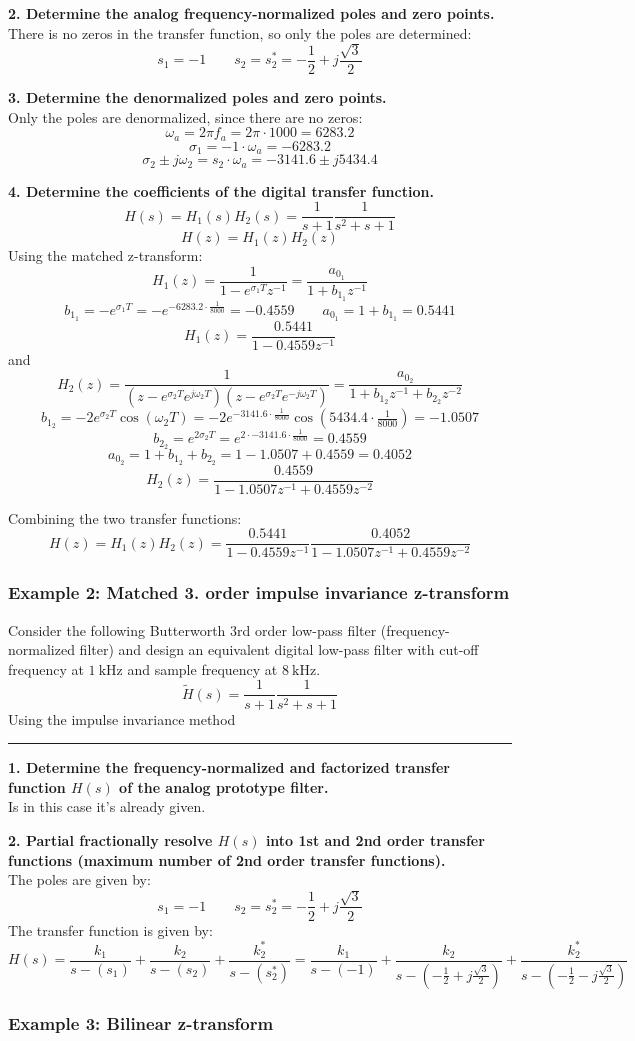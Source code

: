 \textbf{2. Determine the analog frequency-normalized poles and zero points.}\\
There is no zeros in the transfer function, so only the poles are determined:
$$s_1=-1 \qquad s_2=s_2^*=-\frac{1}{2}+j\frac{\sqrt{3}}{2}$$

\textbf{3. Determine the denormalized poles and zero points.}\\
Only the poles are denormalized, since there are no zeros:
$$\omega_a=2\pi f_a=2\pi\cdot 1000=6283.2$$
$$\sigma_1=-1\cdot\omega_a=-6283.2$$
$$\sigma_2\pm j\omega_2=s_2\cdot\omega_a=-3141.6\pm j5434.4$$

\textbf{4. Determine the coefficients of the digital transfer function.}
$$H(s)=H_1(s)H_2(s)=\frac{1}{s+1}\frac{1}{s^{2}+s+1}$$
$$H(z)=H_1(z)H_2(z)$$
Using the matched z-transform:
$$H_1(z)=\frac{1}{1-e^{\sigma_1 T}z^{-1}}=\frac{a_{0_1}}{1+b_{1_1}z^{-1}}$$
$$b_{1_1}=-e^{\sigma_1 T}=-e^{-6283.2\cdot\frac{1}{8000}}=-0.4559\qquad a_{0_1}=1+b_{1_1}=0.5441$$
$$H_1(z)=\frac{0.5441}{1-0.4559z^{-1}}$$
and
$$H_2(z)={\frac{1}{(z-e^{\sigma_{2}T}e^{j\omega_{2}T})(z-e^{\sigma_{2}T}e^{-j\omega_{2}T})}}=\frac{a_{0_2}}{1+b_{1_2}z^{-1}+b_{2_2}z^{-2}}$$
$$b_{1_2}=-2e^{\sigma_2 T}\cos(\omega_2 T)=-2e^{-3141.6\cdot\frac{1}{8000}}\cos(5434.4\cdot\tfrac{1}{8000})=-1.0507$$
$$b_{2_2}=e^{2\sigma_2 T}=e^{2\cdot -3141.6\cdot\frac{1}{8000}}=0.4559$$
$$a_{0_2}=1+b_{1_2}+b_{2_2}=1-1.0507+0.4559=0.4052$$
$$H_2(z)=\frac{0.4559}{1-1.0507z^{-1}+0.4559z^{-2}}$$

Combining the two transfer functions:
$$H(z)=H_1(z)H_2(z)=\frac{0.5441}{1-0.4559z^{-1}}\frac{0.4052}{1-1.0507z^{-1}+0.4559z^{-2}}$$

\subsubsection{Example 2: Matched 3. order impulse invariance z-transform}
Consider the following Butterworth 3rd order low-pass filter (frequency-normalized filter) 
and design an equivalent digital low-pass filter with cut-off frequency at $\SI{1}{\kilo\hertz}$ and sample frequency at $\SI{8}{\kilo\hertz}$. 
$${\tilde{H}}(s)=\frac{1}{s+1}\frac{1}{s^{2}+s+1}$$
Using the impulse invariance method

\rule{\textwidth}{0.5pt}

\textbf{1. Determine the frequency-normalized and factorized transfer function $H(s)$ of the analog prototype filter.}\\
Is in this case it's already given.

\textbf{2. Partial fractionally resolve $H(s)$ into 1st and 2nd order transfer functions (maximum number of 2nd order transfer functions).}\\
The poles are given by:
$$s_1=-1 \qquad s_2=s_2^*=-\frac{1}{2}+j\frac{\sqrt{3}}{2}$$
The transfer function is given by:
$$H(s)=\frac{k_1}{s-(s_1)}+\frac{k_2}{s-(s_2)}+\frac{k_2^*}{s-(s_2^*)}=\frac{k_1}{s-(-1)}+\frac{k_2}{s-(-\frac{1}{2}+j\frac{\sqrt{3}}{2})}+\frac{k_2^*}{s-(-\frac{1}{2}-j\frac{\sqrt{3}}{2})}$$
\subsubsection{Example 3: Bilinear z-transform}
